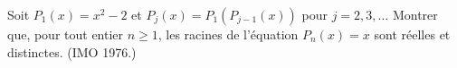 Soit $P_1(x) = x^2 - 2$ et $P_j(x) = P_1\left(P_{j-1}(x)\right)$ pour $j = 2, 3, \ldots$ Montrer que, pour tout entier $n \geq 1$, les racines de l'équation $P_n(x) = x$ sont réelles et distinctes. (IMO 1976.)
